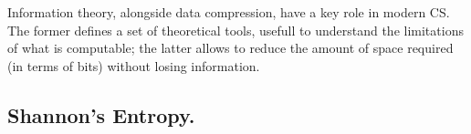 \documentclass{subfiles}
\begin{document}
    Information theory, alongside data compression,
        have a key role in modern CS. 
        The former defines a set of theoretical tools,
        usefull to understand the limitations of what is computable;
        the latter allows to reduce the amount of space required (in terms of bits)
        without losing information.

    \subsection{Shannon's Entropy.}
    
\end{document}
